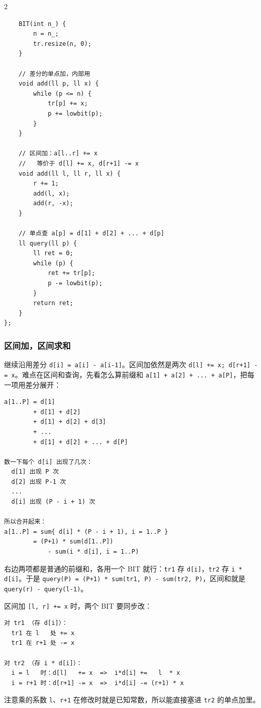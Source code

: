 \begin{multicols*}{2}
\begin{verbatim}
	BIT(int n_) {
		n = n_;
		tr.resize(n, 0);
	}

	// 差分的单点加，内部用
	void add(ll p, ll x) {
		while (p <= n) {
			tr[p] += x;
			p += lowbit(p);
		}
	}

	// 区间加：a[l..r] += x
	//   等价于 d[l] += x, d[r+1] -= x
	void add(ll l, ll r, ll x) {
		r += 1;
		add(l, x);
		add(r, -x);
	}

	// 单点查 a[p] = d[1] + d[2] + ... + d[p]
	ll query(ll p) {
		ll ret = 0;
		while (p) {
			ret += tr[p];
			p -= lowbit(p);
		}
		return ret;
	}
};
	\end{verbatim}

	\subsubsection{区间加，区间求和}

	继续沿用差分 \verb|d[i] = a[i] - a[i-1]|。区间加依然是两次 \verb|d[l] += x; d[r+1] -= x|。难点在区间和查询，先看怎么算前缀和 \verb|a[1] + a[2] + ... + a[P]|，把每一项用差分展开：

	\begin{verbatim}
a[1..P] = d[1]
        + d[1] + d[2]
        + d[1] + d[2] + d[3]
        + ...
        + d[1] + d[2] + ... + d[P]

数一下每个 d[i] 出现了几次：
  d[1] 出现 P 次
  d[2] 出现 P-1 次
  ...
  d[i] 出现 (P - i + 1) 次

所以合并起来：
a[1..P] = sum{ d[i] * (P - i + 1), i = 1..P }
        = (P+1) * sum(d[1..P])
            - sum(i * d[i], i = 1..P)
	\end{verbatim}

	右边两项都是普通的前缀和，各用一个 BIT 就行：\verb|tr1| 存 \verb|d[i]|，\verb|tr2| 存 \verb|i * d[i]|。于是 \verb|query(P) = (P+1) * sum(tr1, P) - sum(tr2, P)|，区间和就是 \verb|query(r) - query(l-1)|。

	区间加 \verb|[l, r] += x| 时，两个 BIT 要同步改：

	\begin{verbatim}
对 tr1 （存 d[i]）：
  tr1 在 l   处 += x
  tr1 在 r+1 处 -= x

对 tr2 （存 i * d[i]）：
  i = l   时：d[l]   += x  =>  i*d[i] +=   l  * x
  i = r+1 时：d[r+1] -= x  =>  i*d[i] -= (r+1) * x
	\end{verbatim}

	注意乘的系数 \verb|l|、\verb|r+1| 在修改时就是已知常数，所以能直接塞进 \verb|tr2| 的单点加里。

	\begin{verbatim}


\end{verbatim}
\end{multicols*}
